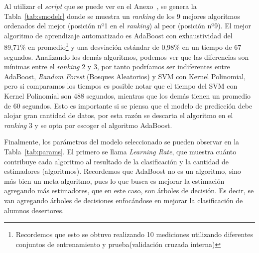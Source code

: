 Al utilizar el \textit{script} que se puede ver en el Anexo~, se genera la Tabla~\ref{tab:smodelr} donde se muestra un \textit{ranking} de los 9 mejores algoritmos ordenados del mejor (posición nº1 en el \textit{ranking}) al peor (posición nº9). El mejor algoritmo de aprendizaje automatizado es AdaBoost con exhaustividad del 89,71\% en promedio\footnote{Recordemos que esto se obtuvo realizando 10 mediciones utilizando diferentes conjuntos de entrenamiento y prueba(validación cruzada interna)} y una desviación estándar de 0,98\% en un tiempo de 67 segundos. Analizando los demás algoritmos, podemos ver que las diferencias son mínimas entre el \textit{ranking} 2 y 3, por tanto podríamos ser indiferentes entre AdaBoost, \textit{Random Forest} (Bosques Aleatorios) y SVM con Kernel Polinomial, pero si comparamos los tiempos es posible notar que el tiempo del SVM con Kernel Polinomial son 488 segundos, mientras que los demás tienen un promedio de 60 segundos. Esto es importante si se piensa que el modelo de predicción debe alojar gran cantidad de datos, por esta razón se descarta el algoritmo en el \textit{ranking} 3 y se opta por escoger el algoritmo AdaBoost.


Finalmente, los parámetros del modelo seleccionado se pueden observar en la Tabla~\ref{tab:params}. El primero se llama \textit{Learning Rate}, que muestra cuánto contribuye cada algoritmo al resultado de la clasificación y la cantidad de estimadores (algoritmos). Recordemos que AdaBoost no es un algoritmo, sino más bien un meta-algoritmo, pues lo que busca es mejorar la estimación agregando más estimadores, que en este caso, son árboles de decisión. Es decir, se van agregando árboles de decisiones enfocándose en mejorar la clasificación de alumnos desertores.


